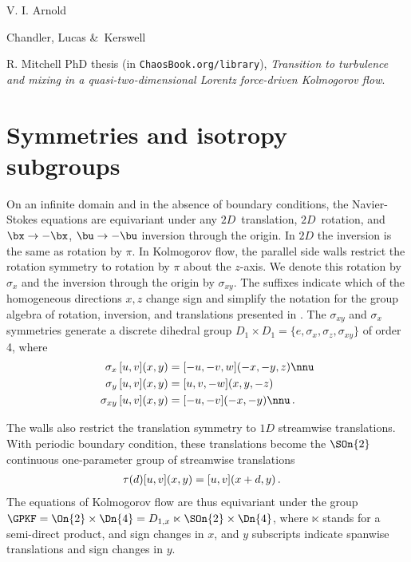 \begin{description}
{V. I. Arnold

Chandler, Lucas \&\ Kerswell

R. Mitchell  PhD thesis
(in \texttt{ChaosBook.org/library}),
{\em Transition to turbulence and mixing in a quasi-two-dimensional
        {Lorentz} force-driven {Kolmogorov} flow}.
    }


\end{description}



\section{Symmetries and isotropy subgroups}
\label{s:KFsymm}

\renewcommand{\ssp}{a}


On an infinite domain and in the absence of boundary conditions, the Navier-Stokes
equations are equivariant under any $2D$~translation, $2D$~rotation, and
$\bx \to -\bx$, $\bu \to -\bu$ inversion through the origin.
In $2D$ the inversion is the same as rotation by $\pi$.
In Kolmogorov flow, the parallel side walls restrict the rotation
symmetry to rotation by $\pi$ about the $z$-axis. We denote this rotation
by $\sigma_{x}$ and the inversion through the origin by $\sigma_{xy}$.
{The suffixes indicate
which of the homogeneous directions $x,z$ change sign and simplify the
notation for the group algebra of rotation, inversion, and translations
presented in .}
The $\sigma_{xy}$ and $\sigma_x$ symmetries generate a discrete dihedral group
$D_1 \times D_1 = \{e,\sigma_x,\sigma_{z},\sigma_{xy}\}$ of order 4, where
\begin{align}
\sigma_x    \, [u,v](x,y) &= [-u,-v,w](-x,-y,z) \nnu \\
\sigma_y    \, [u,v](x,y) &= [u, v,-w](x,y,-z)  \label{sigma}\\
\sigma_{xy} \, [u,v](x,y) &= [-u,-v](-x,-y) \nnu
\,.
\end{align}

The walls also restrict the translation symmetry to $1D$ streamwise
translations. With periodic boundary condition, these translations
become the $\SOn{2}$ continuous one-parameter
group of streamwise translations
\begin{align}
\tau(d) [u,v](x,y) &= [u, v](x+d, y)
\,.
\label{translation}
\end{align}
The equations of Kolmogorov flow are thus equivariant under the group
$\GPKF = \On{2} \times \Dn{4} = D_{1,x} \ltimes \SOn{2} \times \Dn{4}$,
where $\ltimes$ stands for a semi-direct product, and sign changes in
$x$, and $y$ subscripts indicate spanwise translations and sign changes
in $y$.

